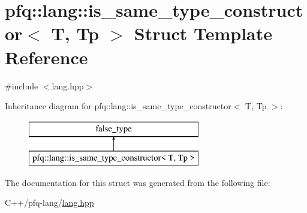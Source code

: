 \hypertarget{structpfq_1_1lang_1_1is__same__type__constructor}{\section{pfq\+:\+:lang\+:\+:is\+\_\+same\+\_\+type\+\_\+constructor$<$ T, Tp $>$ Struct Template Reference}
\label{structpfq_1_1lang_1_1is__same__type__constructor}
}


{\ttfamily \#include $<$lang.\+hpp$>$}

Inheritance diagram for pfq\+:\+:lang\+:\+:is\+\_\+same\+\_\+type\+\_\+constructor$<$ T, Tp $>$\+:\begin{figure}[H]
\begin{center}
\leavevmode
\includegraphics[height=2.000000cm]{structpfq_1_1lang_1_1is__same__type__constructor}
\end{center}
\end{figure}


The documentation for this struct was generated from the following file\+:\begin{DoxyCompactItemize}
\item 
C++/pfq-\/lang/\hyperlink{lang_8hpp}{lang.\+hpp}\end{DoxyCompactItemize}

